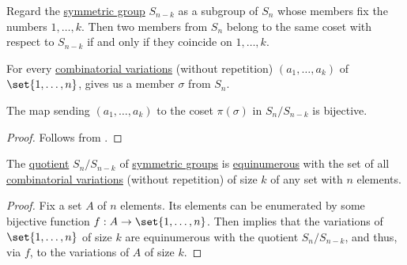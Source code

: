 \begin{lemma}\label{thm:combinatorial_and_algebraic_permutation_quotient_lemma}
  Regard the \hyperref[def:symmetric_group]{symmetric group} \( S_{n - k} \) as a subgroup of \( S_n \) whose members fix the numbers \( 1, \ldots, k \). Then two members from \( S_n \) belong to the same coset with respect to \( S_{n - k} \) if and only if they coincide on \( 1, \ldots, k \).

  For every \hyperref[def:combinatorial_variation]{combinatorial variations} (without repetition) \( (a_1, \ldots, a_k) \) of \( \set{ 1, \ldots, n } \),  gives us a member \( \sigma \) from \( S_n \).

  The map sending \( (a_1, \ldots, a_k) \) to the coset \( \pi(\sigma) \) in \( S_n / S_{n - k} \) is bijective.
\end{lemma}
\begin{proof}
  Follows from .
\end{proof}

\begin{proposition}\label{thm:combinatorial_and_algebraic_permutation_quotient}
  The \hyperref[def:group/quotient]{quotient} \( S_n / S_{n - k} \) of \hyperref[def:symmetric_group]{symmetric groups} is \hyperref[def:equinumerosity]{equinumerous} with the set of all \hyperref[def:combinatorial_variation]{combinatorial variations} (without repetition) of size \( k \) of any set with \( n \) elements.
\end{proposition}
\begin{proof}
  Fix a set \( A \) of \( n \) elements. Its elements can be enumerated by some bijective function \( f: A \to \set{ 1, \ldots, n } \). Then  implies that the variations of \( \set{ 1, \ldots, n } \) of size \( k \) are equinumerous with the quotient \( S_n / S_{n - k} \), and thus, via \( f \), to the variations of \( A \) of size \( k \).
\end{proof}

